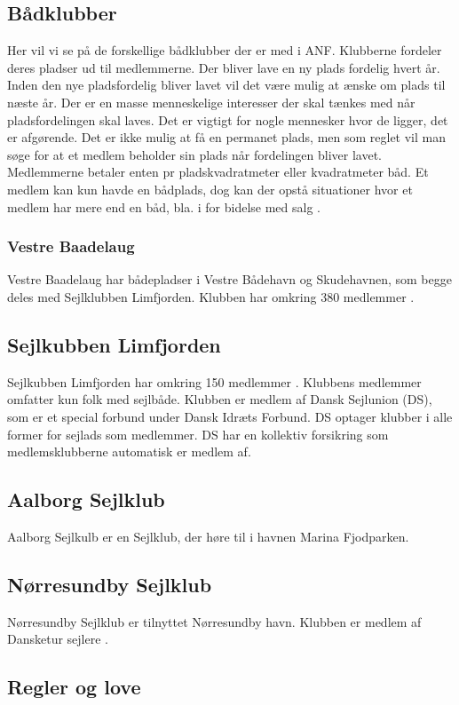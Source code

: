 \subsection{Bådklubber}
Her vil vi se på de forskellige bådklubber der er med i ANF. Klubberne fordeler deres pladser ud til medlemmerne. Der bliver lave en ny plads fordelig hvert år. Inden den nye pladsfordelig bliver lavet vil det være mulig at ænske om plads til næste år. Der er en masse menneskelige interesser der skal tænkes med når pladsfordelingen skal laves. Det er vigtigt for nogle mennesker hvor de ligger, det er afgørende. Det er ikke mulig at få en permanet plads, men som reglet vil man søge for at et medlem beholder sin plads når fordelingen bliver lavet. Medlemmerne betaler enten pr pladskvadratmeter eller kvadratmeter båd. Et medlem kan kun havde en bådplads, dog kan der opstå situationer hvor et medlem har mere end en båd, bla. i for bidelse med salg \cite{int_vb_sl}.

\subsubsection{Vestre Baadelaug}
Vestre Baadelaug har bådepladser i Vestre Bådehavn og Skudehavnen, som begge deles med Sejlklubben Limfjorden. Klubben har omkring 380 medlemmer \cite{int_vb_sl}. 

\subsection{Sejlkubben Limfjorden}
Sejlkubben Limfjorden har omkring 150 medlemmer \cite{int_vb_sl}. Klubbens medlemmer omfatter kun folk med sejlbåde. Klubben er medlem af Dansk Sejlunion (DS), som er et special forbund under Dansk Idræts Forbund. DS optager klubber i alle former for sejlads som medlemmer. DS har en kollektiv forsikring som medlemsklubberne automatisk er medlem af. 

\subsection{Aalborg Sejlklub}
Aalborg Sejlkulb er en Sejlklub, der høre til i havnen Marina Fjodparken.

\subsection{Nørresundby Sejlklub}
Nørresundby Sejlklub er tilnyttet Nørresundby havn. Klubben er medlem af Dansketur sejlere \cite{norresundby_sejlklub}.

\subsection{Regler og love}
\cite{standardreglement}